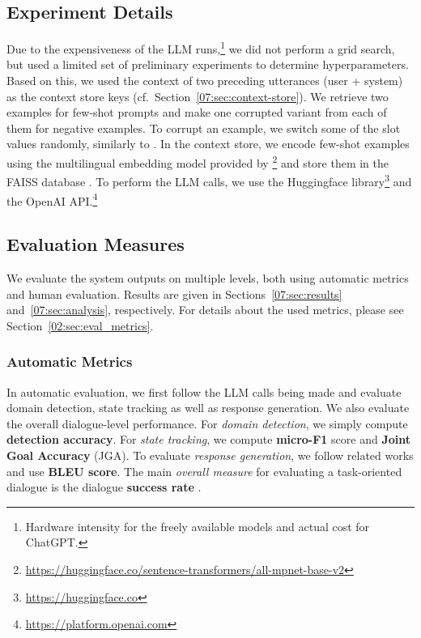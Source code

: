 \subsection{Experiment Details}
\label{subsec:exp-details}
Due to the expensiveness of the LLM runs,\footnote{Hardware intensity for the freely available models and actual cost for ChatGPT.} we did not perform a grid search, but used a limited set of preliminary experiments to determine hyperparameters.
Based on this, we used the context of two preceding  utterances (user + system) as the context store keys (cf.~Section~\ref{07:sec:context-store}).
We retrieve two examples for few-shot prompts and make one corrupted variant from each of them for negative examples.
To corrupt an example, we switch some of the slot values randomly, similarly to \citet{kulhanek-etal-2021-augpt}.
In the context store, we encode few-shot examples using the multilingual embedding model provided by \citet{reimers-2020-multilingual-sentence-bert}\footnote{\url{https://huggingface.co/sentence-transformers/all-mpnet-base-v2}} and store them in the FAISS database \cite{johnson2019billion}.
To perform the LLM calls, we use the Huggingface library\footnote{\url{https://huggingface.co}} and the OpenAI API.\footnote{\url{https://platform.openai.com}}

\subsection{Evaluation Measures}

We evaluate the system outputs on multiple levels, both using automatic metrics and human evaluation. Results are given in Sections~\ref{07:sec:results} and~\ref{07:sec:analysis}, respectively.
For details about the used metrics, please see Section~\ref{02:sec:eval_metrics}.
\subsubsection*{Automatic Metrics}
In automatic evaluation, we first follow the LLM calls being made and evaluate domain detection, state tracking as well as response generation. We also evaluate the overall dialogue-level performance.
For \emph{domain detection}, we simply compute \textbf{detection accuracy}.
For \emph{state tracking}, we compute \textbf{micro-F1} score and \textbf{Joint Goal Accuracy} (JGA).
To evaluate \emph{response generation}, we follow related works and use \textbf{BLEU score}.
The main \emph{overall measure} for evaluating a task-oriented dialogue is the dialogue \textbf{success rate} \cite{deriu_survey_2021}.

